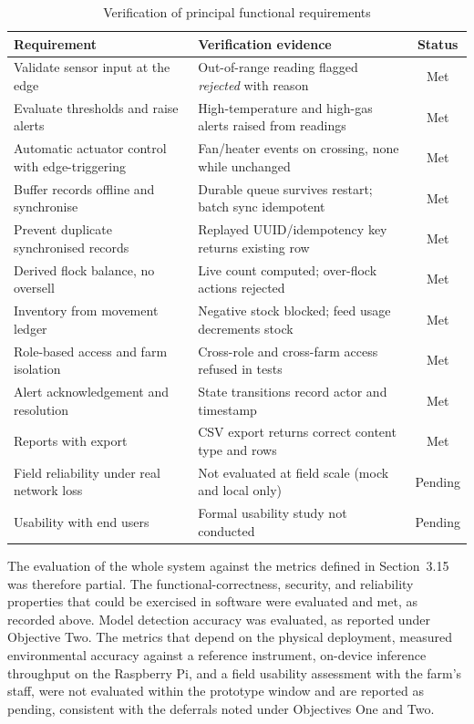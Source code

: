 \documentclass[12pt,a4paper]{report}
\begin{document}
\begin{table}[tbp]
\centering
\caption{Verification of principal functional requirements}
\label{tab:reqverif}
\begin{tabularx}{\textwidth}{@{}p{4.3cm}Xc@{}}
\toprule
\textbf{Requirement} & \textbf{Verification evidence} & \textbf{Status} \\
\midrule
Validate sensor input at the edge & Out-of-range reading flagged \emph{rejected} with reason & Met \\
Evaluate thresholds and raise alerts & High-temperature and high-gas alerts raised from readings & Met \\
Automatic actuator control with edge-triggering & Fan/heater events on crossing, none while unchanged & Met \\
Buffer records offline and synchronise & Durable queue survives restart; batch sync idempotent & Met \\
Prevent duplicate synchronised records & Replayed UUID/idempotency key returns existing row & Met \\
Derived flock balance, no oversell & Live count computed; over-flock actions rejected & Met \\
Inventory from movement ledger & Negative stock blocked; feed usage decrements stock & Met \\
Role-based access and farm isolation & Cross-role and cross-farm access refused in tests & Met \\
Alert acknowledgement and resolution & State transitions record actor and timestamp & Met \\
Reports with export & CSV export returns correct content type and rows & Met \\
Field reliability under real network loss & Not evaluated at field scale (mock and local only) & Pending \\
Usability with end users & Formal usability study not conducted & Pending \\
\bottomrule
\end{tabularx}
\end{table}

The evaluation of the whole system against the metrics defined in Section~3.15 was therefore partial. The functional-correctness, security, and reliability properties that could be exercised in software were evaluated and met, as recorded above. Model detection accuracy was evaluated, as reported under Objective Two. The metrics that depend on the physical deployment, measured environmental accuracy against a reference instrument, on-device inference throughput on the Raspberry Pi, and a field usability assessment with the farm's staff, were not evaluated within the prototype window and are reported as pending, consistent with the deferrals noted under Objectives One and Two.
\end{document}
